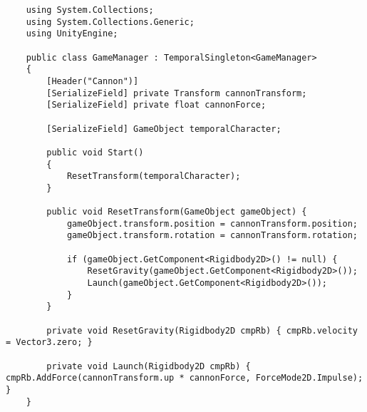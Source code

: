 \begin{lstlisting}
	using System.Collections;
	using System.Collections.Generic;
	using UnityEngine;
	
	public class GameManager : TemporalSingleton<GameManager>
	{
		[Header("Cannon")]
		[SerializeField] private Transform cannonTransform;
		[SerializeField] private float cannonForce;
		
		[SerializeField] GameObject temporalCharacter;
		
		public void Start()
		{
			ResetTransform(temporalCharacter);
		}
		
		public void ResetTransform(GameObject gameObject) {
			gameObject.transform.position = cannonTransform.position;
			gameObject.transform.rotation = cannonTransform.rotation;
			
			if (gameObject.GetComponent<Rigidbody2D>() != null) { 
				ResetGravity(gameObject.GetComponent<Rigidbody2D>());
				Launch(gameObject.GetComponent<Rigidbody2D>()); 
			}
		}
		
		private void ResetGravity(Rigidbody2D cmpRb) { cmpRb.velocity = Vector3.zero; }
		
		private void Launch(Rigidbody2D cmpRb) { cmpRb.AddForce(cannonTransform.up * cannonForce, ForceMode2D.Impulse); }
	}
\end{lstlisting}